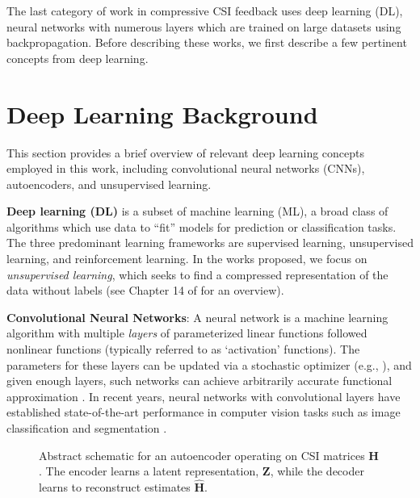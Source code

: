 The last category of work in compressive CSI feedback uses deep learning (DL), neural networks with numerous layers which are trained on large datasets using backpropagation. Before describing these works, we first describe a few pertinent concepts from deep learning.

\section{Deep Learning Background}
\label{sect:dl_overview}

This section provides a brief overview of relevant deep learning concepts employed in this work, including convolutional neural networks (CNNs), autoencoders, and unsupervised learning.

\textbf{Deep learning (DL)} is a subset of machine learning (ML), a broad class of algorithms which use data to ``fit'' models for prediction or classification tasks. The three predominant learning frameworks are supervised learning, unsupervised learning, and reinforcement learning. In the works proposed, we focus on \emph{unsupervised learning}, which seeks to find a compressed representation of the data without labels (see Chapter 14 of \cite{ref:Hastie2016Elements} for an overview).

\textbf{Convolutional Neural Networks}: A neural network is a machine learning algorithm with multiple \emph{layers} of parameterized linear functions followed nonlinear functions (typically referred to as `activation' functions). The parameters for these layers can be updated via a stochastic optimizer (e.g., \cite{ref:Kingma2014ADAM}), and given enough layers, such networks can achieve arbitrarily accurate functional approximation \cite{ref:Hecht1992TheoryBackprop}. In recent years, neural networks with convolutional layers have established state-of-the-art performance in computer vision tasks such as image classification \cite{ref:Sabour2017Dynamic} and segmentation \cite{ref:He2017Mask}.

\begin{figure}[!hbtp]
\centering
\def\svgwidth{0.8\columnwidth}

\caption{Abstract schematic for an autoencoder operating on CSI matrices $\mathbf H$. The encoder learns a latent representation, $\mathbf Z$, while the decoder learns to reconstruct estimates $\hat{\mathbf H}$.}
\label{fig:autoencoder_schematic}
\end{figure}

